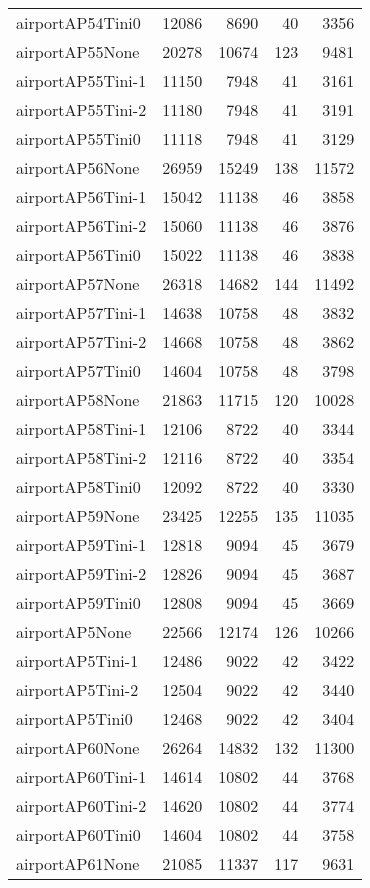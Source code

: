 \begin{longtable}{lrrrr}
airportAP54Tini0 & 12086 & 8690 & 40 & 3356 \\
airportAP55None & 20278 & 10674 & 123 & 9481 \\
airportAP55Tini-1 & 11150 & 7948 & 41 & 3161 \\
airportAP55Tini-2 & 11180 & 7948 & 41 & 3191 \\
airportAP55Tini0 & 11118 & 7948 & 41 & 3129 \\
airportAP56None & 26959 & 15249 & 138 & 11572 \\
airportAP56Tini-1 & 15042 & 11138 & 46 & 3858 \\
airportAP56Tini-2 & 15060 & 11138 & 46 & 3876 \\
airportAP56Tini0 & 15022 & 11138 & 46 & 3838 \\
airportAP57None & 26318 & 14682 & 144 & 11492 \\
airportAP57Tini-1 & 14638 & 10758 & 48 & 3832 \\
airportAP57Tini-2 & 14668 & 10758 & 48 & 3862 \\
airportAP57Tini0 & 14604 & 10758 & 48 & 3798 \\
airportAP58None & 21863 & 11715 & 120 & 10028 \\
airportAP58Tini-1 & 12106 & 8722 & 40 & 3344 \\
airportAP58Tini-2 & 12116 & 8722 & 40 & 3354 \\
airportAP58Tini0 & 12092 & 8722 & 40 & 3330 \\
airportAP59None & 23425 & 12255 & 135 & 11035 \\
airportAP59Tini-1 & 12818 & 9094 & 45 & 3679 \\
airportAP59Tini-2 & 12826 & 9094 & 45 & 3687 \\
airportAP59Tini0 & 12808 & 9094 & 45 & 3669 \\
airportAP5None & 22566 & 12174 & 126 & 10266 \\
airportAP5Tini-1 & 12486 & 9022 & 42 & 3422 \\
airportAP5Tini-2 & 12504 & 9022 & 42 & 3440 \\
airportAP5Tini0 & 12468 & 9022 & 42 & 3404 \\
airportAP60None & 26264 & 14832 & 132 & 11300 \\
airportAP60Tini-1 & 14614 & 10802 & 44 & 3768 \\
airportAP60Tini-2 & 14620 & 10802 & 44 & 3774 \\
airportAP60Tini0 & 14604 & 10802 & 44 & 3758 \\
airportAP61None & 21085 & 11337 & 117 & 9631 \\

\end{longtable}
